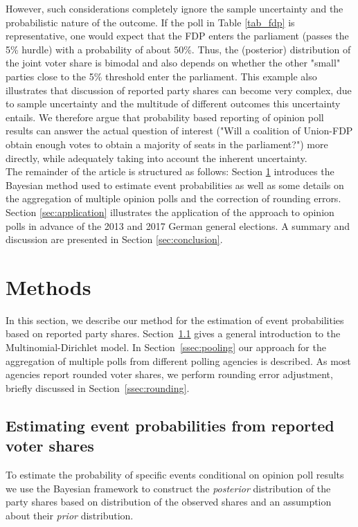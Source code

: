 \documentclass[smallcondensed]{svjour3}     %
\begin{document}
However, such considerations completely ignore the sample uncertainty and the
probabilistic nature of the outcome. If the poll in Table \ref{tab_fdp} is representative,
one would expect that the FDP enters the parliament (passes the 5\% hurdle) with a
probability of about $50\%$. Thus, the (posterior) distribution of the joint voter
share is bimodal and also depends on whether the other "small" parties close to
the 5\% threshold enter the parliament. This example also illustrates that discussion
of reported party shares can become very complex, due to sample uncertainty
and the multitude of different outcomes this uncertainty entails.
We therefore argue that probability based reporting of opinion poll results can
answer the actual question of interest ("Will a coalition of Union-FDP obtain
enough votes to obtain a majority of seats in the parliament?") more directly, while
adequately taking into account the inherent uncertainty.\\

The remainder of the article is structured as follows: Section \ref{sec:methods}
introduces the Bayesian method used to estimate event probabilities as well
as some details on the aggregation of multiple opinion polls and the correction
of rounding errors. Section \ref{sec:application} illustrates the
application of the approach to opinion polls in advance of the  2013 and 2017
German general elections. A summary and discussion are presented in Section
\ref{sec:conclusion}.\\

\section{Methods}\label{sec:methods}
In this section, we describe our method for the estimation of event
probabilities based on reported party shares. Section~\ref{ssec:bayes} gives a
general introduction to the Multinomial-Dirichlet model. In Section~\ref{ssec:pooling}
our approach for the aggregation of multiple polls from different polling agencies
is described. As most agencies report rounded voter shares, we perform rounding
error adjustment, briefly discussed in Section~\ref{ssec:rounding}.

\subsection{Estimating event probabilities from reported voter shares} \label{ssec:bayes}
To estimate the probability of specific events conditional on opinion poll results
we use the Bayesian framework to construct the \emph{posterior} distribution of
the party shares based on distribution of the observed shares and an assumption
about their \emph{prior} distribution.\\
\end{document}

